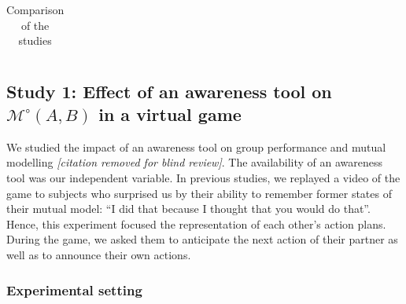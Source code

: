 \documentclass[natbib]{svjour3}
\newcommand{\gModel}[2]{{$\mathcal{M}^{\circ}(#1, #2)$}}
\begin{document}
\begin{table}[ht!]
{\begin{tabular}{p{2.6cm}|p{3.5cm}|p{3.5cm}|p{3.5cm}|p{3.5cm}|p{3.5cm}}
\end{tabular}
}
\caption{Comparison of the studies}
\label{synthesis_table}
\end{table}



\subsection{{\bf Study 1}: Effect of an awareness tool on \gModel{A}{B} in a virtual
game}

We studied the impact of an awareness tool on group performance and mutual
modelling \textit{[citation removed for blind review]}. The availability of an
awareness tool was our independent variable. In previous studies, we replayed a
video of the game to subjects who surprised us by their ability to remember
former states of their mutual model: ``I did that because I thought that you
would do that''. Hence, this experiment focused the representation of each
other's action plans. During the game, we asked them to anticipate the next
action of their partner as well as to announce their own actions.

\subsubsection*{Experimental setting}
\end{document}
